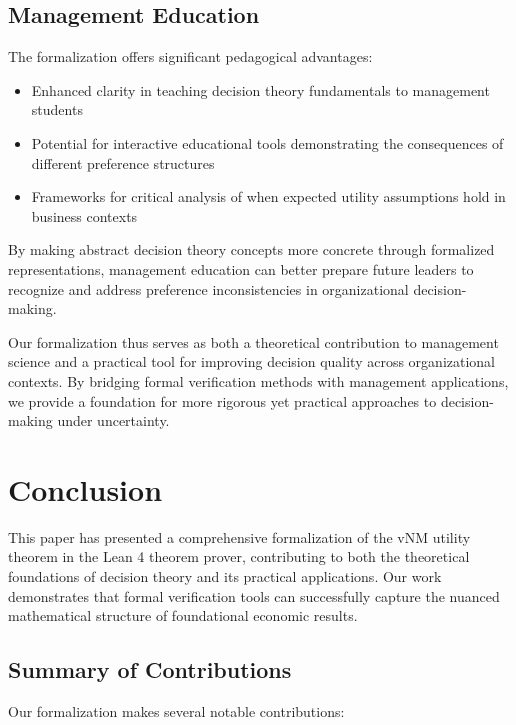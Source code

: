 \documentclass{article}
\theoremstyle{definition}
\begin{document}
\subsection{Management Education}

The formalization offers significant pedagogical advantages:

\begin{itemize}
    \item Enhanced clarity in teaching decision theory fundamentals to management students
    \item Potential for interactive educational tools demonstrating the consequences of different preference structures
    \item Frameworks for critical analysis of when expected utility assumptions hold in business contexts
\end{itemize}

By making abstract decision theory concepts more concrete through formalized representations, management education can better prepare future leaders to recognize and address preference inconsistencies in organizational decision-making.

Our formalization thus serves as both a theoretical contribution to management science and a practical tool for improving decision quality across organizational contexts. By bridging formal verification methods with management applications, we provide a foundation for more rigorous yet practical approaches to decision-making under uncertainty.

\section{Conclusion}\label{sec:conclusion}

This paper has presented a comprehensive formalization of the vNM utility theorem in the Lean 4 theorem prover, contributing to both the theoretical foundations of decision theory and its practical applications. Our work demonstrates that formal verification tools can successfully capture the nuanced mathematical structure of foundational economic results.

\subsection{Summary of Contributions}

Our formalization makes several notable contributions:
\end{document}
